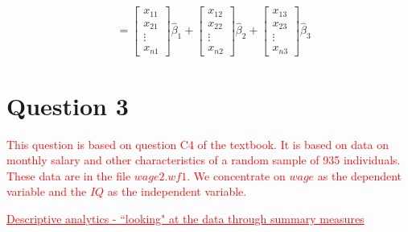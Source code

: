 \documentclass[12pt]{report}
\begin{document}
\begin{align*}
	&=
	\begin{bmatrix}
	x_{11} \\
	x_{21} \\
	\vdots \\
	x_{n1} 
	\end{bmatrix}
	\hat{\beta}_1
	+
	\begin{bmatrix}
	x_{12} \\
	x_{22} \\
	\vdots \\
	x_{n2} 
	\end{bmatrix}
	\hat{\beta}_2
	+
	\begin{bmatrix}
	x_{13} \\
	x_{23} \\
	\vdots \\
	x_{n3} 
	\end{bmatrix}
	\hat{\beta}_3
\end{align*}

\newpage
\section*{Question 3}
\noindent \textcolor{red}{This question is based on question C4 of the textbook. It is based on data on monthly salary and other characteristics of a random sample of 935 individuals. These data are in the file $wage2.wf1$. We concentrate on $wage$ as the dependent variable and the $IQ$ as the independent variable.}

\noindent \textcolor{red}{\underline{Descriptive analytics - ``looking" at the data through summary measures}}
\end{document}
